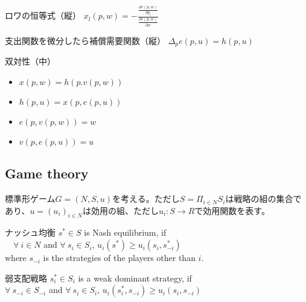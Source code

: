 \documentclass{jsarticle}
\begin{document}
\begin{itembox}[l]{ロワの恒等式（縦）}
	$x_l (p, w) = -\frac{\frac{\partial v(p, w)}{\partial p_l}}{\frac{\partial v(p, w)}{\partial w}}$
\end{itembox}

\begin{itembox}[l]{支出関数を微分したら補償需要関数（縦）}
	$\Delta_p e(p, u) = h(p, u)$
\end{itembox}

\begin{itembox}[l]{双対性（中）}
	\begin{itemize}
		\item $x(p, w) = h(p. v(p, w))$
		\item $h(p, u) = x(p, e(p, u))$
		\item $e(p, v(p, w)) = w$
		\item $v(p, e(p, u)) = u$
	\end{itemize}
\end{itembox}

\subsection{Game theory}
標準形ゲーム$G = (N, S, u)$を考える。ただし$S = \Pi_{i \in N} S_i$は戦略の組の集合であり、$u = (u_i)_{i \in N}$は効用の組、ただし$u_i : S \to R$で効用関数を表す。
\begin{itembox}[l]{ナッシュ均衡}
	$s^* \in S$ is Nash equilibrium, if \\
	$\quad \forall \ i \in N$ and $\forall \ s_i \in S_i$, $u_i(s^*) \geq u_i(s_i, s_{-i}^*)$\\
	where $s_{-i}$ is the strategies of the players other than $i$.
\end{itembox}

\begin{itembox}[l]{弱支配戦略}
	$s_i^* \in S_i$ is a weak dominant strategy, if \\
	$\forall \ s_{-i} \in S_{-i}$ and $\forall \ s_i \in S_i$, $u_i(s_i^*, s_{-i}) \geq u_i(s_i, s_{-i})$
\end{itembox}
\end{document}
